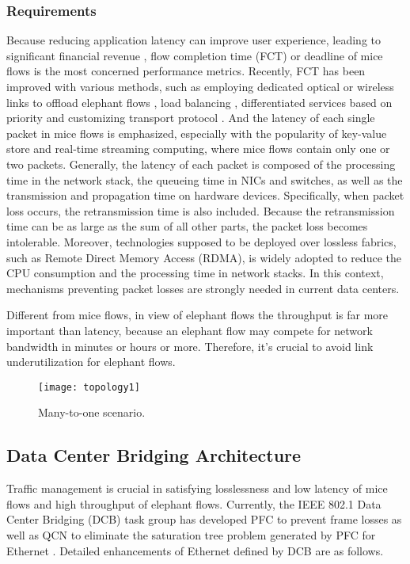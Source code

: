 \documentclass[]{sig-alternate-10pt}
\begin{document}
\subsubsection{Requirements}
Because reducing application latency can improve user experience, leading to significant financial revenue \cite{latency}, flow completion time (FCT) or deadline of mice flows is the most concerned performance metrics.
Recently, FCT has been improved with various methods,
such as employing dedicated optical or wireless links to offload elephant flows \cite{wang2011c, farrington2011helios, halperin2011augmenting, hamedazimi2014firefly}, load balancing \cite{al2010hedera, benson2011microte, alizadeh2014conga, he2015presto}, differentiated services based on priority \cite{hong2012finishing, alizadeh2013pfabric, grosvenor2015queues, bai2015information} and customizing transport protocol \cite{alizadeh2011data, vamanan2012deadline, wilson2011better, mittal2015timely, zhu2015congestion}.
And the latency of each single packet in mice flows is emphasized, especially with the popularity of key-value store and real-time streaming computing, where mice flows contain only one or two packets.
Generally, the latency of each packet is composed of the processing time in the network stack, the queueing time in NICs and switches, as well as the transmission and propagation time on hardware devices. Specifically, when packet loss occurs, the retransmission time is also included.
Because the retransmission time can be as large as the sum of all other parts, the packet loss becomes intolerable.
Moreover, technologies supposed to be deployed over lossless fabrics, such as Remote Direct Memory Access (RDMA), is widely adopted to reduce the CPU consumption and the processing time in network stacks. In this context, mechanisms preventing packet losses are strongly needed in current data centers.





Different from mice flows, in view of elephant flows the throughput is far more important than latency, because an elephant flow may compete for network bandwidth in minutes or hours or more. Therefore, it's crucial to avoid link underutilization for elephant flows.
\begin{figure}[t]
	\centering
	\texttt{[image: topology1]}
	\caption{Many-to-one scenario.}
	\label{fig:topology}
\end{figure}

\subsection{Data Center Bridging Architecture}
Traffic management is crucial in satisfying losslessness and low latency of mice flows and high throughput of elephant flows.
Currently, the IEEE 802.1 Data Center Bridging (DCB) task group has developed PFC to prevent frame losses as well as QCN to eliminate the saturation tree problem generated by PFC for Ethernet \cite{ieee8021dcb}.
Detailed enhancements of Ethernet defined by DCB are as follows.
\end{document}
